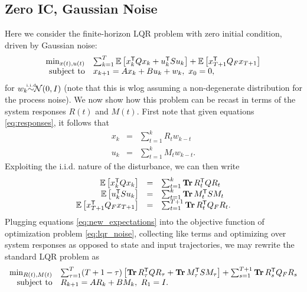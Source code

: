\documentclass[11pt]{article}
\numberwithin{equation}{section}
\begin{document}
\subsection{Zero IC, Gaussian Noise}
Here we consider the finite-horizon LQR problem with zero initial condition, driven by Gaussian noise:
\begin{equation}
\begin{array}{rl}
\min_{x(t),u(t)} & \sum_{k=1}^T \mathbb{E}\left[x_k^{\mathsf{T}} Q x_k + u_k^{\mathsf{T}} Su_k\right] + \mathbb{E}\left[x_{T+1}^{\mathsf{T}} Q_F x_{T+1}\right] \\
\mbox{subject to} & x_{k+1} = Ax_k + Bu_k + w_k, \ x_0 = 0,
\end{array}
\label{eq:lqr_noise}
\end{equation}
for $w_k {\iid}\mathcal{N}(0,I)$ (note that this is wlog assuming a non-degenerate distribution for the process noise).  We now show how this problem can be recast in terms of the system responses $R(t)$ and $M(t)$.  First note that given equations \eqref{eq:responses}, it follows that
\begin{equation}
\begin{array}{rcl}
x_k &=& \sum_{t=1}^k R_t w_{k-t} \\
u_k &=& \sum_{t=1}^k M_t w_{k-t}.
\end{array}
\label{eq:dist}
\end{equation}
Exploiting the i.i.d. nature of the disturbance, we can then write
\begin{equation}
\begin{array}{rcl}
\mathbb{E}\left[x_k^{\mathsf{T}} Q x_k\right] &=& \sum_{t=1}^k \operatorname*{\mathbf{Tr}} R_t^{\mathsf{T}} Q R_t \\
\mathbb{E}\left[u_k^{\mathsf{T}} S u_k\right] &=& \sum_{t=1}^k \operatorname*{\mathbf{Tr}} M_t^{\mathsf{T}} S M_t \\
\mathbb{E}\left[x_{T+1}^{\mathsf{T}} Q_F x_{T+1}\right] &=& \sum_{t=1}^{T+1} \operatorname*{\mathbf{Tr}} R_t^{\mathsf{T}} Q_F R_t.
\end{array}
\label{eq:new_expectations}
\end{equation}
Plugging equations \eqref{eq:new_expectations} into the objective function of optimization problem \eqref{eq:lqr_noise}, collecting like terms and optimizing over system responses as opposed to state and input trajectories, we may rewrite the standard LQR problem as
\begin{equation}
\begin{array}{rl}
\min_{R(t),M(t)} & \sum_{\tau=1}^T (T+1-\tau)\left[\operatorname*{\mathbf{Tr}} R_\tau^{\mathsf{T}} Q R_\tau + \operatorname*{\mathbf{Tr}} M_\tau^{\mathsf{T}} S M_\tau\right] + \sum_{s=1}^{T+1} \operatorname*{\mathbf{Tr}} R_s^{\mathsf{T}} Q_F R_s \\
\mbox{subject to} & R_{k+1} = AR_k + BM_k, \ R_1 = I.
\end{array}
\end{equation}
\end{document}
